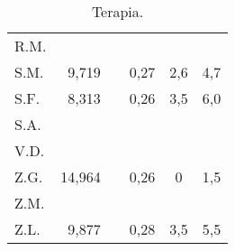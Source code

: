 \begin{table}[!h]
\begin{center}
\begin{tabular}{lrcccl}
R.M.	&            &            &             &                  &  \\
S.M.	& 9,719      & \checkmark &  0,27       & 2,6              & 4,7 \\
S.F.	& 8,313      &            &  0,26       & 3,5              & 6,0 \\
S.A.	&            &            &             &                  &  \\
V.D.	&            &            &             &                  &  \\
Z.G.	& 14,964     &            &  0,26       & 0                & 1,5 \\
Z.M.	&            &            &             &                  &  \\
Z.L.	& 9,877      &            &  0,28       & 3,5              & 5,5 \\
\bottomrule
\end{tabular}
\end{center}
\caption{Terapia.}
\label{tab:Terapia}
\end{table}

